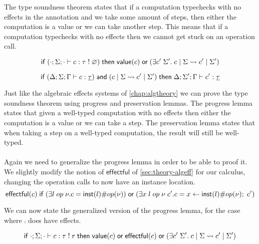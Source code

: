 {The type soundness theorem states that if a computation typechecks with no effects in the annotation and we take some amount of steps, then either the computation is a value or we can take another step.
This means that if a computation typechecks with no effects then we cannot get stuck on an operation call.

\begin{lemma}[Progress]
\[
	\mathsf{if}\;
		(\cdot;\Sigma;\cdot \vdash c : \tau \; ! \; \varnothing)
	\;\mathsf{then}\;
		\mathsf{value}(c)
		\;\mathsf{or}\;
		(\exists c' \; \Sigma'.\; c \;|\; \Sigma \rightsquigarrow c' \;|\; \Sigma')
\]
\end{lemma}

\begin{lemma}[Preservation]
\[
	\mathsf{if}\;
		(\Delta;\Sigma;\Gamma \vdash c : \underline{\tau})
		\;\mathsf{and}\;
		(c \;|\; \Sigma \rightsquigarrow c' \;|\; \Sigma')
	\;\mathsf{then}\;
		\Delta;\Sigma';\Gamma \vdash c' : \underline{\tau}
\]
\end{lemma}

Just like the algebraic effects systems of \cref{chap:algtheory} we can prove the type soundness theorem using progress and preservation lemmas.
The progress lemma states that given a well-typed computation with no effects then either the computation is a value or we can take a step.
The preservation lemma states that when taking a step on a well-typed computation, the result will still be well-typed.
\\\\
Again we need to generalize the progress lemma in order to be able to proof it.
We slightly modify the notion of $\mathsf{effectful}$ of \cref{sec:theory-algeff} for our calculus, changing the operation calls to now have an instance location.
	\[ \mathsf{effectful}(c) \;\mathsf{if}\; (\exists l \; op \; \nu. c = \mathsf{inst}(l) \# op(\nu)) \;\mathsf{or}\; (\exists x \; l \; op \; \nu \; c'. c = x \leftarrow \mathsf{inst}(l) \# op(\nu) ;\; c') \]

We can now state the generalized version of the progress lemma, for the case where $\comp$ does have effects.

\begin{lemma}
\[
	\mathsf{if}\;
		\cdot;\Sigma;\cdot \vdash c : \tau \; ! \; r
	\;\mathsf{then}\;
		\mathsf{value}(c)
		\;\mathsf{or}\;
		\mathsf{effectful}(c)
		\;\mathsf{or}\;
		(\exists c' \; \Sigma'.\; c \;|\; \Sigma \rightsquigarrow c' \;|\; \Sigma')
\]
\end{lemma}

}
